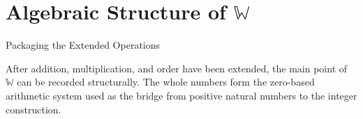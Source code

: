 
\section{Algebraic Structure of \texorpdfstring{$\mathbb{W}$}{W}}
\label{sec:algebraic-structure-of-w}
\begin{topicbox}{Packaging the Extended Operations}
\begin{exposition}
After addition, multiplication, and order have been extended, the main point
of $\mathbb{W}$ can be recorded structurally. The whole numbers form the
zero-based arithmetic system used as the bridge from positive natural numbers
to the integer construction.
\end{exposition}
\end{topicbox}
